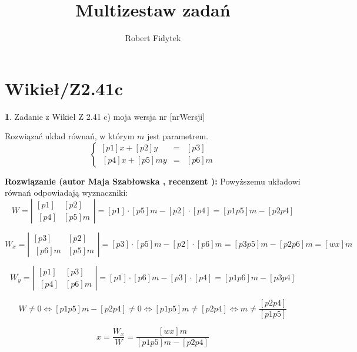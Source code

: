 \documentclass[12pt, a4paper]{article}
\title{Multizestaw zadań}
\author{Robert Fidytek}
\date{}
\theoremstyle{definition} %
\newtheorem{zad}{}
\newcommand{\kategoria}[1]{\section{#1}} %
\newcommand{\zadStart}[1]{\begin{zad}#1\newline} %
\newcommand{\zadStop}{\end{zad}}   %
\newcommand{\rozwStart}[2]{\noindent \textbf{Rozwiązanie (autor #1 , recenzent #2): }\newline} %
\begin{document}
\maketitle


\kategoria{Wikieł/Z2.41c}
\zadStart{Zadanie z Wikieł Z 2.41 c)  moja wersja nr [nrWersji]}

Rozwiązać układ równań, w którym $m$ jest parametrem.
$$\left\{\begin{array}{ccc}
[p1]x+[p2]y&=&[p3]\\
\ [p4]x+[p5]my&=&[p6]m
\end{array} \right.$$

\zadStop
\rozwStart{Maja Szabłowska}{}
Powyższemu układowi równań odpowiadają wyznaczniki:
$$W=\left| \begin{array}{lccr} [p1] & [p2] \\ \ [p4] & [p5]m \end{array}\right| = [p1]\cdot[p5]m - [p2]\cdot[p4]=[p1p5]m-[p2p4]$$

$$W_{x}=\left| \begin{array}{lccr} [p3] & [p2] \\ \ [p6]m & [p5]m \end{array}\right| = [p3]\cdot[p5]m - [p2]\cdot[p6]m=[p3p5]m-[p2p6]m=[wx]m$$

$$W_{y}=\left| \begin{array}{lccr} [p1] & [p3] \\ \ [p4] & [p6]m \end{array}\right| = [p1]\cdot[p6]m - [p3]\cdot[p4]=[p1p6]m-[p3p4]$$

$$W\neq 0 \iff [p1p5]m-[p2p4] \neq 0 \iff [p1p5]m\neq[p2p4] \iff
m\neq \frac{[p2p4]}{[p1p5]} $$

$$x=\frac{W_{x}}{W}=\frac{[wx]m}{[p1p5]m-[p2p4]}$$
\end{document}
